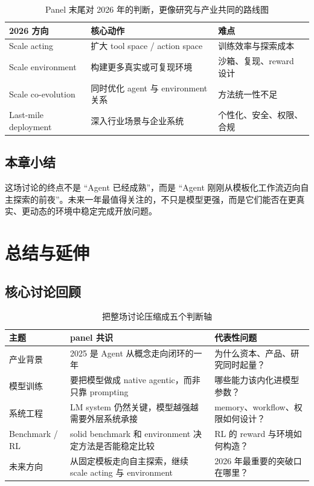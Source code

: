 \documentclass[a4paper]{article}
\begin{document}
\begin{table}[H]
\centering
\begin{tabular}{p{3.1cm}p{4.1cm}p{4.4cm}}
\toprule
\textbf{2026 方向} & \textbf{核心动作} & \textbf{难点} \\
\midrule
Scale acting & 扩大 tool space / action space & 训练效率与探索成本 \\
Scale environment & 构建更多真实或可复现环境 & 沙箱、复现、reward 设计 \\
Scale co-evolution & 同时优化 agent 与 environment 关系 & 方法统一性不足 \\
Last-mile deployment & 深入行业场景与企业系统 & 个性化、安全、权限、合规 \\
\bottomrule
\end{tabular}
\caption{Panel 末尾对 2026 年的判断，更像研究与产业共同的路线图}
\end{table}

\subsection{本章小结}
这场讨论的终点不是 ``Agent 已经成熟''，而是 ``Agent 刚刚从模板化工作流迈向自主探索的前夜''。未来一年最值得关注的，不只是模型更强，而是它们能否在更真实、更动态的环境中稳定完成开放问题。

\section{总结与延伸}

\subsection{核心讨论回顾}
\begin{table}[H]
\centering
\begin{tabular}{p{2.8cm}p{4.0cm}p{5.0cm}}
\toprule
\textbf{主题} & \textbf{panel 共识} & \textbf{代表性问题} \\
\midrule
产业背景 & 2025 是 Agent 从概念走向闭环的一年 & 为什么资本、产品、研究同时起量？ \\
模型训练 & 要把模型做成 native agentic，而非只靠 prompting & 哪些能力该内化进模型参数？ \\
系统工程 & LM system 仍然关键，模型越强越需要外层系统承接 & memory、workflow、权限如何设计？ \\
Benchmark / RL & solid benchmark 和 environment 决定方法是否能稳定比较 & RL 的 reward 与环境如何构造？ \\
未来方向 & 从固定模板走向自主探索，继续 scale acting 与 environment & 2026 年最重要的突破口在哪里？ \\
\bottomrule
\end{tabular}
\caption{把整场讨论压缩成五个判断轴}
\end{table}
\end{document}
